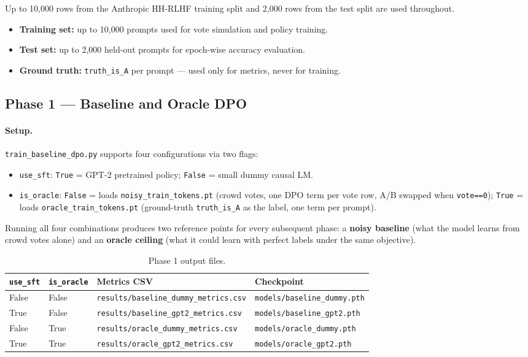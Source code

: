 \documentclass[11pt, a4paper]{article}
\begin{document}
Up to 10,000 rows from the Anthropic HH-RLHF training split and 2,000 rows from the test
split are used throughout.
\begin{itemize}[noitemsep]
  \item \textbf{Training set:} up to 10,000 prompts used for vote simulation and policy training.
  \item \textbf{Test set:} up to 2,000 held-out prompts for epoch-wise accuracy evaluation.
  \item \textbf{Ground truth:} \texttt{truth\_is\_A} per prompt --- used only for metrics,
        never for training.
\end{itemize}

\subsection{Phase 1 --- Baseline and Oracle DPO}

\paragraph{Setup.}
\texttt{train\_baseline\_dpo.py} supports four configurations via two flags:

\begin{itemize}[noitemsep]
  \item \texttt{use\_sft}: \texttt{True} = GPT-2 pretrained policy; \texttt{False} = small
        dummy causal LM.
  \item \texttt{is\_oracle}: \texttt{False} = loads \texttt{noisy\_train\_tokens.pt}
        (crowd votes, one DPO term per vote row, A/B swapped when \texttt{vote==0});
        \texttt{True} = loads \texttt{oracle\_train\_tokens.pt} (ground-truth
        \texttt{truth\_is\_A} as the label, one term per prompt).
\end{itemize}

Running all four combinations produces two reference points for every subsequent phase:
a \textbf{noisy baseline} (what the model learns from crowd votes alone) and an
\textbf{oracle ceiling} (what it could learn with perfect labels under the same objective).

\begin{table}[H]
  \centering
  \caption{Phase 1 output files.}
  \begin{tabular}{llll}
    \toprule
    \textbf{\texttt{use\_sft}} & \textbf{\texttt{is\_oracle}} & \textbf{Metrics CSV} & \textbf{Checkpoint} \\
    \midrule
    False & False & \texttt{results/baseline\_dummy\_metrics.csv} & \texttt{models/baseline\_dummy.pth} \\
    True  & False & \texttt{results/baseline\_gpt2\_metrics.csv}  & \texttt{models/baseline\_gpt2.pth}  \\
    False & True  & \texttt{results/oracle\_dummy\_metrics.csv}   & \texttt{models/oracle\_dummy.pth}   \\
    True  & True  & \texttt{results/oracle\_gpt2\_metrics.csv}    & \texttt{models/oracle\_gpt2.pth}    \\
    \bottomrule
  \end{tabular}
\end{table}
\end{document}
